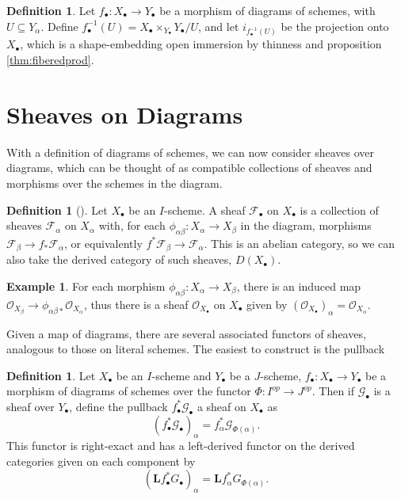 \documentclass[proquest]{uwthesis}[2014/11/13]
\theoremstyle{definition}
\newtheorem{definition}[theorem]{Definition}
\newtheorem{example}[theorem]{Example}
\newcommand{\FF}{\mathscr{F}}
\newcommand{\GG}{\mathscr{G}}
\newcommand{\bL}{\textbf{L}}
\newcommand{\OO}{\mathcal{O}}
\begin{document}
\begin{definition}
	\label{def:diagrampreimage}
	Let $f_\bullet : X_\bullet \rightarrow Y_\bullet$ be a morphism of diagrams of schemes, with $U \subseteq Y_\alpha$.
	Define $f_\bullet^{-1}(U) = X_\bullet \times_{Y_\bullet} Y_\bullet / U$, and let $i_{f_\bullet^{-1} (U)}$ be the projection onto $X_\bullet$, which is a shape-embedding open immersion by thinness and proposition \ref{thm:fiberedprod}.
\end{definition}

\section{Sheaves on Diagrams}
With a definition of diagrams of schemes, we can now consider sheaves over diagrams, which can be thought of as compatible collections of sheaves and morphisms over the schemes in the diagram.

\begin{definition}[{\cite[10.84]{Kollar2013}}]
	Let $X_\bullet$ be an $I$-scheme.
	A sheaf $\FF_\bullet$ on $X_\bullet$ is a collection of sheaves $\FF_\alpha$ on $X_\alpha$ with, for each $\phi_{\alpha\beta} : X_\alpha \rightarrow X_\beta$ in the diagram, morphisms $\FF_\beta \rightarrow f_* \FF_\alpha$, or equivalently $f^* \FF_\beta \rightarrow \FF_\alpha$.
	This is an abelian category, so we can also take the derived category of such sheaves, $D(X_\bullet)$.
\end{definition}

\begin{example}
	For each morphism $\phi_{\alpha\beta}:X_\alpha \rightarrow X_\beta$, there is an induced map ${\OO_{X_\beta} \rightarrow \phi_{\alpha\beta *} \OO_{X_\alpha}}$, thus there is a sheaf $\OO_{X_\bullet}$ on $X_\bullet$ given by $(\OO_{X_\bullet})_\alpha = \OO_{X_\alpha}$.
\end{example}

Given a map of diagrams, there are several associated functors of sheaves, analogous to those on literal schemes.
The easiest to construct is the pullback

\begin{definition}
	Let $X_\bullet$ be an $I$-scheme and $Y_\bullet$ be a $J$-scheme, $f_\bullet : X_\bullet \rightarrow Y_\bullet$ be a morphism of diagrams of schemes over the functor $\Phi : I^{op} \rightarrow J^{op}$.
	Then if $\GG_\bullet$ is a sheaf over $Y_\bullet$, define the pullback $f^*_\bullet \GG_\bullet$ a sheaf on $X_\bullet$ as
	\[
	(f^*_\bullet \GG_\bullet)_\alpha = f_\alpha^* \GG_{\Phi(\alpha)}.
	\]
	This functor is right-exact and has a left-derived functor on the derived categories given on each component by
	\[
	(\bL f^*_\bullet G_\bullet)_\alpha = \bL f_\alpha^* G_{\Phi(\alpha)}.
	\]
\end{definition}
\end{document}
